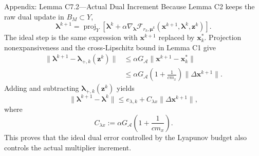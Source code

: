 \documentclass[handout,compress,9pt]{beamer}
\newcommand{\bx}{\bm{x}}
\newcommand{\bz}{\bm{z}}
\newcommand{\bmu}{\bm{\mu}}
\newcommand{\blmbd}{\bm{\lambda}}
\newcommand{\calA}{\mathcal{A}}
\begin{document}
\begin{frame}{Appendix: Lemma C7.2---Actual Dual Increment
\hfill\hyperlink{appendix:contents}{}}
\scriptsize
Because Lemma C2 keeps the raw dual update in $B_M\subset Y$,
\begin{equation*}
  \blmbd^{k+1}=\operatorname{proj}_Y\left[
  \blmbd^k+\alpha\nabla_{\blmbd}\mathcal F_{r_k,\bmu^k}
  (\bx^{k+1},\blmbd^k,\bz^k)\right].
\end{equation*}
The ideal step is the same expression with $\bx^{k+1}$ replaced by
$\bx_k^*$.  Projection nonexpansiveness and the cross-Lipschitz bound in
Lemma C1 give
\begin{equation*}
\begin{aligned}
  \|\blmbd^{k+1}-\blmbd_{+,k}(\bz^k)\|
  &\le\alpha G_{\calA}\|\bx^{k+1}-\bx_k^*\|\\
  &\le\alpha G_{\calA}
  \left(1+\frac1{cm_x}\right)\|\Delta\bx^{k+1}\|.
\end{aligned}
\end{equation*}
Adding and subtracting $\blmbd_{+,k}(\bz^k)$ yields
\begin{equation*}
  \|\blmbd^{k+1}-\blmbd^k\|
  \le e_{\lambda,k}+C_{\lambda x}\|\Delta\bx^{k+1}\|,
\end{equation*}
where
\begin{equation*}
  C_{\lambda x}:=\alpha G_{\calA}
  \left(1+\frac1{cm_x}\right).
\end{equation*}
This proves that the ideal dual error controlled by the Lyapunov budget also
controls the actual multiplier increment.
\end{frame}
\end{document}
